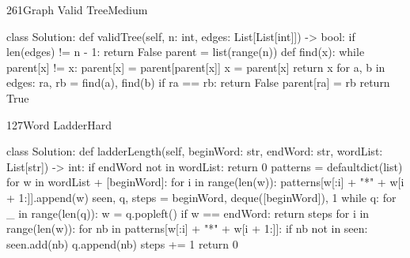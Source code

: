\begin{problem}{261}{Graph Valid Tree}{Medium}
\begin{code}
class Solution:
    def validTree(self, n: int, edges: List[List[int]]) -> bool:
        if len(edges) != n - 1:
            return False
        parent = list(range(n))
        def find(x):
            while parent[x] != x:
                parent[x] = parent[parent[x]]
                x = parent[x]
            return x
        for a, b in edges:
            ra, rb = find(a), find(b)
            if ra == rb:
                return False
            parent[ra] = rb
        return True
\end{code}
\end{problem}

\begin{problem}{127}{Word Ladder}{Hard}
\begin{code}
class Solution:
    def ladderLength(self, beginWord: str, endWord: str, wordList: List[str]) -> int:
        if endWord not in wordList:
            return 0
        patterns = defaultdict(list)
        for w in wordList + [beginWord]:
            for i in range(len(w)):
                patterns[w[:i] + "*" + w[i + 1:]].append(w)
        seen, q, steps = {beginWord}, deque([beginWord]), 1
        while q:
            for _ in range(len(q)):
                w = q.popleft()
                if w == endWord:
                    return steps
                for i in range(len(w)):
                    for nb in patterns[w[:i] + "*" + w[i + 1:]]:
                        if nb not in seen:
                            seen.add(nb)
                            q.append(nb)
            steps += 1
        return 0
\end{code}
\end{problem}
